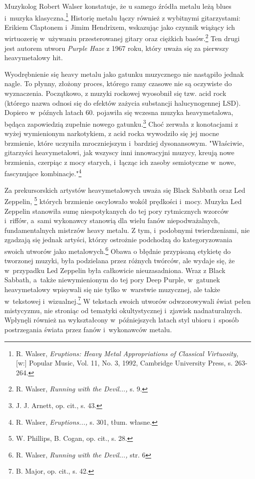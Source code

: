 \documentclass[12pt, a4paper, titlepage]{report}
\begin{document}
 
Muzykolog Robert Walser konstatuje, że u samego źródła metalu leżą blues i~muzyka klasyczna.\footnote{R. Walser, \textit{Eruptions: Heavy Metal Appropriations of Classical Virtuosity,} [w:] Popular Music, Vol. 11, No. 3, 1992, Cambridge University Press, s. 263-264.} %
Historię metalu łączy również z wybitnymi gitarzystami: Erikiem Claptonem i~Jimim Hendrixem, wskazując jako czynnik wiążący ich wirtuozerię w~używaniu przesterowanej gitary oraz ciężkich basów.\footnote{R. Walser, \textit{Running with the Devil...,} s. 9.} Ten drugi jest autorem utworu \textit{Purple Haze} z 1967 roku, który uważa się za pierwszy heavymetalowy hit.

Wyodrębnienie się heavy metalu jako gatunku muzycznego nie nastąpiło jednak nagle. To płynny, złożony proces, którego ramy czasowe nie są oczywiste do wyznaczenia. Początkowo, z muzyki rockowej wyosobnił się tzw. acid rock (którego nazwa odnosi się do efektów zażycia substancji halucynogennej LSD). Dopiero w~późnych latach 60. pojawiła się wczesna muzyka heavymetalowa, będąca zapowiedzią zupełnie nowego gatunku.\footnote{J. J. Arnett, op. cit., s. 43.} Choć zerwała z konotacjami z wyżej wymienionym narkotykiem, z acid rocka wywodziło się jej mocne brzmienie, które uczyniła mroczniejszym i~bardziej dysonansowym. "Właściwie, gitarzyści heavymetalowi, jak wszyscy inni innowacyjni muzycy, kreują nowe brzmienia, czerpiąc z mocy starych, i~łącząc ich zasoby semiotyczne w~nowe, fascynujące kombinacje."\footnote{R. Walser, \textit{Eruptions...,} s. 301, tłum. własne.} 

Za prekursorskich artystów heavymetalowych uważa się Black Sabbath oraz Led Zeppelin, \footnote{W. Phillips, B. Cogan, op. cit., s. 28.} których brzmienie oscylowało wokół prędkości i~mocy. Muzyka Led Zeppelin stanowiła sumę niespotykanych do tej pory rytmicznych wzorców i~riffów, a~sami wykonawcy stanowią dla wielu fanów niepodważalnych, fundamentalnych mistrzów heavy metalu. Z tym, i~podobnymi twierdzeniami, nie zgadzają się jednak artyści, którzy ostrożnie podchodzą do kategoryzowania swoich utworów jako metalowych.\footnote{R. Walser, \textit{Running with the Devil...,} str. 6} Obawa o błędnie przypisaną etykietę do tworzonej muzyki, była podzielana przez różnych twórców, ale wydaje się, że w~przypadku Led Zeppelin była całkowicie nieuzasadniona. Wraz z Black Sabbath, a~także niewymienionym do tej pory Deep Purple, w~gatunek heavymetalowy wpisywali się nie tylko w~warstwie muzycznej, ale także w~tekstowej i~wizualnej.\footnote{B. Major, op. cit., s. 42.} W tekstach swoich utworów odwzorowywali świat pełen mistycyzmu, nie stroniąc od tematyki okultystycznej i~zjawisk nadnaturalnych. Wpłynęli również na wykształcony w~późniejszych latach styl ubioru i~sposób postrzegania świata przez fanów i~wykonawców metalu. 
\end{document}
